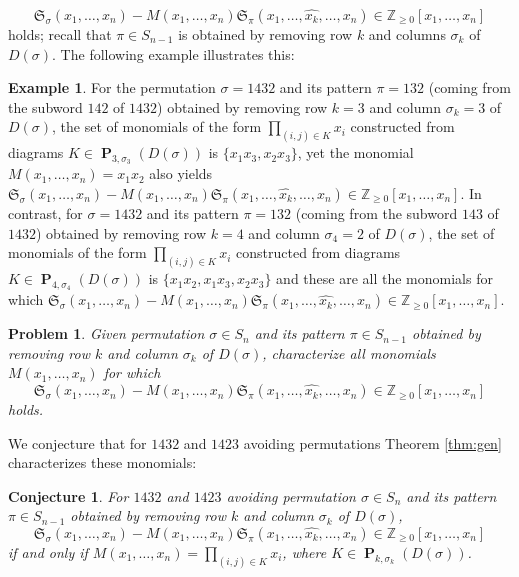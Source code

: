 \documentclass{amsart}
\newtheorem{conjecture}[theorem]{Conjecture}
\newtheorem{problem}[theorem]{Problem}
\theoremstyle{definition}
\newtheorem{example}[theorem]{Example}
\theoremstyle{named}
\DeclareMathOperator*{\Purple}{\mathbf{P}}
\begin{document}
$$\mathfrak{S}_{\sigma}(x_1, \ldots, x_n)-M(x_1, \ldots, x_n) \mathfrak{S}_{\pi}(x_{1}, \ldots, \widehat{x_k}, \ldots, x_{n}) \in \mathbb{Z}_{\geq 0}[x_1, \ldots, x_n]$$ holds; recall that   $\pi \in S_{n-1}$  is obtained by removing row $k$ and columns $\sigma_k$ of $D(\sigma)$. The following example illustrates this:


\begin{example} For the permutation $\sigma=1432$ and its pattern $\pi=132$ (coming from the subword $142$ of $1432$) obtained by removing row $k=3$ and column $\sigma_k=3$ of $D(\sigma)$, the set of monomials of the form $\prod_{(i, j) \in K} x_i$ constructed from diagrams $K \in \Purple_{3, \sigma_3}(D(\sigma))$ is $\{x_1x_3, x_2x_3\}$, yet the monomial $M(x_1, \ldots, x_n) = x_1x_2$ also yields $\mathfrak{S}_{\sigma}(x_1, \ldots, x_n)-M(x_1, \ldots, x_n) \mathfrak{S}_{\pi}(x_{1}, \ldots, \widehat{x_k}, \ldots, x_{n}) \in \mathbb{Z}_{\geq 0}[x_1, \ldots, x_n]$. In contrast, for $\sigma=1432$ and its pattern $\pi=132$ (coming from the subword $143$ of $1432$)  obtained by removing row $k=4$ and column $\sigma_4=2$ of $D(\sigma)$, the set of monomials of the form $\prod_{(i, j) \in K} x_i$ constructed from  diagrams $K \in \Purple_{4, \sigma_4}(D(\sigma))$ is $\{ x_1x_2, x_1x_3, x_2x_3\}$ and these are all the monomials for which $\mathfrak{S}_{\sigma}(x_1, \ldots, x_n)-M(x_1, \ldots, x_n) \mathfrak{S}_{\pi}(x_{1}, \ldots, \widehat{x_k}, \ldots, x_{n}) \in \mathbb{Z}_{\geq 0}[x_1, \ldots, x_n]$. \end{example}
	
	 

	\begin{problem} \label{prob:char} Given permutation $\sigma \in S_n$ and its pattern  $\pi \in S_{n-1}$  obtained by removing row $k$ and column $\sigma_k$ of $D(\sigma)$, characterize all monomials $M(x_1, \ldots, x_n)$ for which  $$\mathfrak{S}_{\sigma}(x_1, \ldots, x_n)-M(x_1, \ldots, x_n) \mathfrak{S}_{\pi}(x_{1}, \ldots, \widehat{x_k}, \ldots, x_{n}) \in \mathbb{Z}_{\geq 0}[x_1, \ldots, x_n]$$ holds. \end{problem}

We conjecture that for $1432$ and $1423$ avoiding permutations Theorem \ref{thm:gen} characterizes these monomials:

\begin{conjecture} \label{conj:16} For $1432$ and $1423$ avoiding permutation $\sigma \in S_n$ and its pattern $\pi \in S_{n-1}$ obtained by removing row $k$ and column $\sigma_k$ of $D(\sigma)$, 
$$\mathfrak{S}_{\sigma}(x_1, \ldots, x_n)-M(x_1, \ldots, x_n) \mathfrak{S}_{\pi}(x_{1}, \ldots, \widehat{x_k}, \ldots, x_{n}) \in \mathbb{Z}_{\geq 0}[x_1, \ldots, x_n]$$ if and only if $M(x_1, \dots, x_n) = \prod_{(i, j) \in K} x_i$, where $K \in \Purple_{k, \sigma_k}(D(\sigma))$. 
\end{conjecture}
\end{document}
